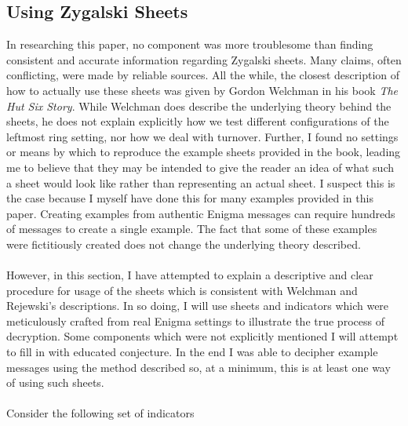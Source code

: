 \subsection{Using Zygalski Sheets}
In researching this paper, no component was more troublesome than finding consistent and accurate information regarding Zygalski sheets. Many claims, often conflicting, were made by reliable sources. All the while, the closest description of how to actually use these sheets was given by Gordon Welchman in his book \emph{The Hut Six Story}. While Welchman does describe the underlying theory behind the sheets, he does not explain explicitly how we test different configurations of the leftmost ring setting, nor how we deal with turnover. Further, I found no settings or means by which to reproduce the example sheets provided in the book, leading me to believe that they may be intended to give the reader an idea of what such a sheet would look like rather than representing an actual sheet. I suspect this is the case because I myself have done this for many examples provided in this paper. Creating examples from authentic Enigma messages can require hundreds of messages to create a single example. The fact that some of these examples were fictitiously created does not change the underlying theory described.
\\\\However, in this section, I have attempted to explain a descriptive and clear procedure for usage of the sheets which is consistent with Welchman and Rejewski's descriptions. In so doing, I will use sheets and indicators which were meticulously crafted from real Enigma settings to illustrate the true process of decryption. Some components which were not explicitly mentioned I will attempt to fill in with educated conjecture. In the end I was able to decipher example messages using the method described so, at a minimum, this is at least one way of using such sheets.
\\\\Consider the following set of indicators
